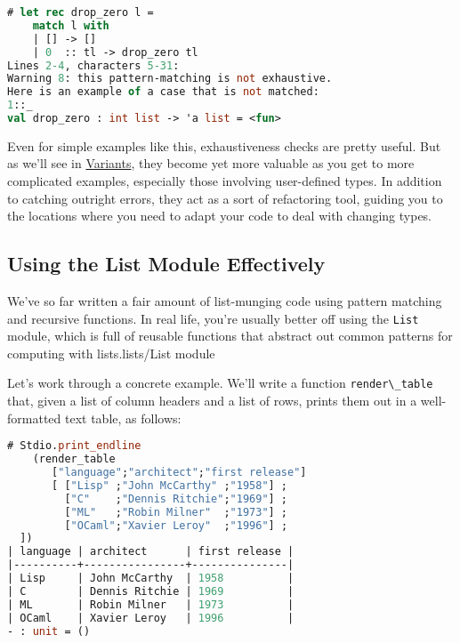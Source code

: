 \begin{lstlisting}[language=Caml]
# let rec drop_zero l =
    match l with
    | [] -> []
    | 0  :: tl -> drop_zero tl
Lines 2-4, characters 5-31:
Warning 8: this pattern-matching is not exhaustive.
Here is an example of a case that is not matched:
1::_
val drop_zero : int list -> 'a list = <fun>
\end{lstlisting}

Even for simple examples like this, exhaustiveness checks are pretty
useful. But as we'll see in \href{variants.html\#variants}{Variants},
they become yet more valuable as you get to more complicated examples,
especially those involving user-defined types. In addition to catching
outright errors, they act as a sort of refactoring tool, guiding you to
the locations where you need to adapt your code to deal with changing
types.~

\hypertarget{using-the-list-module-effectively}{%
\subsection{Using the List Module
Effectively}\label{using-the-list-module-effectively}}

We've so far written a fair amount of list-munging code using pattern
matching and recursive functions. In real life, you're usually better
off using the \passthrough{\lstinline!List!} module, which is full of
reusable functions that abstract out common patterns for computing with
lists.\protect\hypertarget{Llistmod}{}{lists/List
module}

Let's work through a concrete example. We'll write a function
\passthrough{\lstinline!render\_table!} that, given a list of column
headers and a list of rows, prints them out in a well-formatted text
table, as follows:

\begin{lstlisting}[language=Caml]
# Stdio.print_endline
    (render_table
       ["language";"architect";"first release"]
       [ ["Lisp" ;"John McCarthy" ;"1958"] ;
         ["C"    ;"Dennis Ritchie";"1969"] ;
         ["ML"   ;"Robin Milner"  ;"1973"] ;
         ["OCaml";"Xavier Leroy"  ;"1996"] ;
  ])
| language | architect      | first release |
|----------+----------------+---------------|
| Lisp     | John McCarthy  | 1958          |
| C        | Dennis Ritchie | 1969          |
| ML       | Robin Milner   | 1973          |
| OCaml    | Xavier Leroy   | 1996          |
- : unit = ()
\end{lstlisting}

